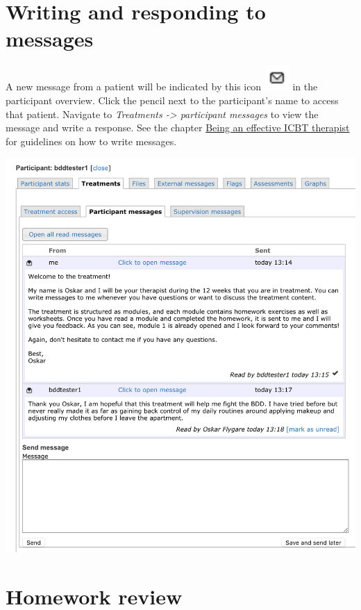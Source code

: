 \documentclass[]{book}
\begin{document}
\hypertarget{writing-and-responding-to-messages}{%
\section{Writing and responding to messages}\label{writing-and-responding-to-messages}}

A new message from a patient will be indicated by this icon \includegraphics{images/message-icon.png} in the participant overview. Click the pencil next to the participant's name to access that patient. Navigate to \emph{Treatments -\textgreater{} participant messages} to view the message and write a response. See the chapter \protect\hyperlink{being-an-effective-icbt-therapist}{Being an effective ICBT therapist} for guidelines on how to write messages.

\includegraphics{images/therapist-messages.png}

\hypertarget{homework-review}{%
\section{Homework review}\label{homework-review}}
\end{document}
